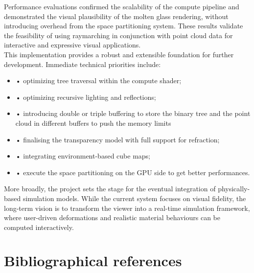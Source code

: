 \documentclass{rapportcs}
\begin{document}
\noindent Performance evaluations confirmed the scalability of the compute pipeline and demonstrated the visual plausibility of the molten glass rendering, without introducing overhead from the space partitioning system. These results validate the feasibility of using raymarching in conjunction with point cloud data for interactive and expressive visual applications.\\

\noindent This implementation provides a robust and extensible foundation for further development. Immediate technical priorities include:\\

\begin{itemize}
    \item[\hspace{0cm}] • optimizing tree traversal within the compute shader;  
    \item[\hspace{0cm}] • optimizing recursive lighting and reflections;  
    \item[\hspace{0cm}] • introducing double or triple buffering to store the binary tree and the point cloud in different buffers to push the memory limits 
    \item[\hspace{0cm}] • finalising the transparency model with full support for refraction;  
    \item[\hspace{0cm}] • integrating environment-based cube maps;  
    \item[\hspace{0cm}] • execute the space partitioning on the GPU side to get better performances.\\
\end{itemize}

\noindent More broadly, the project sets the stage for the eventual integration of physically-based simulation models. While the current system focuses on visual fidelity, the long-term vision is to transform the viewer into a real-time simulation framework, where user-driven deformations and realistic material behaviours can be computed interactively.

\newpage

\section{Bibliographical references}
\nocite{*}
\begingroup
    \renewcommand{\refname}{}%
    \vspace*{-2em} %
\endgroup
\end{document}
